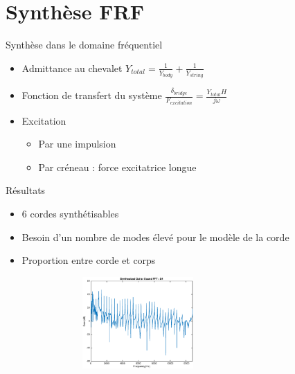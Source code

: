 \section{Synthèse FRF}

\begin{frame}{Synthèse dans le domaine fréquentiel}

 \begin{itemize}
  \item Admittance au chevalet
  \( {Y_{total}} = \frac{1}{Y_{body}} + \frac{1}{Y_{string}} \)
  
  \item Fonction de transfert du système
  \( \frac{\delta_{bridge}}{F_{excitation}} = \frac{Y_{total}H}{j\omega} \)

  \item Excitation
  	\begin{itemize}
	 \item Par une impulsion
     \item Par créneau : force excitatrice longue
     \end{itemize}

   
 \end{itemize}
\end{frame}

\begin{frame}{Résultats}

	\begin{itemize}
		\item 6 cordes synthétisables
		\item Besoin d'un nombre de modes élevé pour le modèle de la corde
		\item Proportion entre corde et corps		
		
	\end{itemize}
	 \begin{figure}
		\centering
		\includegraphics[width=8cm,height=3.5cm]{figures/frf_synthesized_sound_E4.eps}
	\end{figure}
\end{frame}